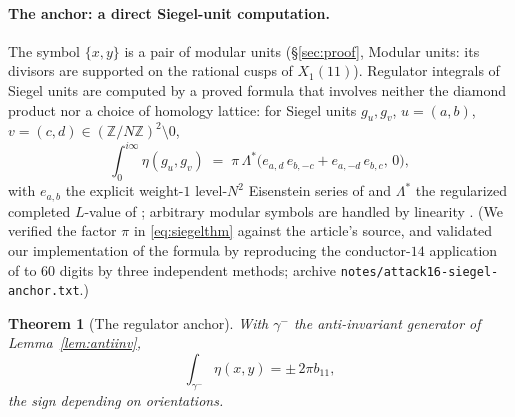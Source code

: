 \documentclass[11pt]{amsart}
\newtheorem{theorem}{Theorem}[section]
\theoremstyle{definition}
\theoremstyle{remark}
\newcommand{\Z}{\mathbb{Z}}
\begin{document}
\paragraph{The anchor: a direct Siegel-unit computation.}
The symbol $\{x,y\}$ is a pair of modular units (\S\ref{sec:proof}, Modular
units: its divisors are supported on the rational cusps of $X_1(11)$).
Regulator integrals of Siegel units are computed by a proved formula that
involves neither the diamond product nor a choice of homology lattice:
for Siegel units $g_u,g_v$, $u=(a,b)$, $v=(c,d)\in(\Z/N\Z)^2\setminus0$,
\begin{equation}\label{eq:siegelthm}
  \int_0^{i\infty}\eta(g_u,g_v)
  \;=\;\pi\,\Lambda^*\bigl(e_{a,d}\,e_{b,-c}+e_{a,-d}\,e_{b,c},\,0\bigr),
\end{equation}
with $e_{a,b}$ the explicit weight-$1$ level-$N^2$ Eisenstein series of
\cite[Thm.~1, eq.~(2)]{BrunaultSiegel} and $\Lambda^*$ the regularized
completed $L$-value of \cite[\S2]{BrunaultSiegel}; arbitrary modular
symbols are handled by linearity \cite[Rem.~2]{BrunaultSiegel}.  (We
verified the factor $\pi$ in \eqref{eq:siegelthm} against the article's
source, and validated our implementation of the formula by reproducing the
conductor-$14$ application of \cite[\S5.1]{BrunaultSiegel} to $60$ digits
by three independent methods; archive
\texttt{notes/attack16-siegel-anchor.txt}.)

\begin{theorem}[The regulator anchor]\label{thm:anchor}
With $\gamma^-$ the anti-invariant generator of Lemma~\ref{lem:antiinv},
\begin{equation}\label{eq:anchor}
  \int_{\gamma^-}\eta(x,y)=\pm\,2\pi b_{11},
\end{equation}
the sign depending on orientations.
\end{theorem}
\end{document}
